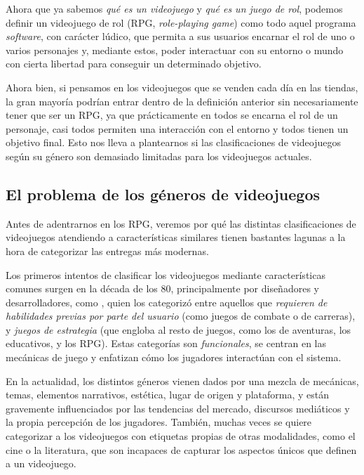 \medskip

Ahora que ya sabemos \textit{qué es un videojuego} y \textit{qué es un juego de rol}, podemos definir un videojuego de rol (RPG, \textit{role-playing game}) como todo aquel programa \textit{software}, con carácter lúdico, que permita a sus usuarios encarnar el rol de uno o varios personajes y, mediante estos, poder interactuar con su entorno o mundo con cierta libertad para conseguir un determinado objetivo.

\smallskip

Ahora bien, si pensamos en los videojuegos que se venden cada día en las tiendas, la gran mayoría podrían entrar dentro de la definición anterior sin necesariamente tener que ser un RPG, ya que prácticamente en todos se encarna el rol de un personaje, casi todos permiten una interacción con el entorno y todos tienen un objetivo final. Esto nos lleva a plantearnos si las clasificaciones de videojuegos según su género son demasiado limitadas para los videojuegos actuales.

\subsection{El problema de los géneros de videojuegos}
Antes de adentrarnos en los RPG, veremos por qué las distintas clasificaciones de videojuegos atendiendo a características similares tienen bastantes lagunas a la hora de categorizar las entregas más modernas.

\smallskip

Los primeros intentos de clasificar los videojuegos mediante características comunes surgen en la década de los 80, principalmente por diseñadores y desarrolladores, como \cite{Crawford84}, quien los categorizó entre aquellos que \textit{requieren de habilidades previas por parte del usuario} (como juegos de combate o de carreras), y \textit{juegos de estrategia} (que engloba al resto de juegos, como los de aventuras, los educativos, y los RPG). Estas categorías son \textit{funcionales}, se centran en las mecánicas de juego y enfatizan cómo los jugadores interactúan con el sistema.

\smallskip

En la actualidad, los distintos géneros vienen dados por una mezcla de mecánicas, temas, elementos narrativos, estética, lugar de origen y plataforma, y están gravemente influenciados por las tendencias del mercado, discursos mediáticos y la propia percepción de los jugadores. También, muchas veces se quiere categorizar a los videojuegos con etiquetas propias de otras modalidades, como el cine o la literatura, que son incapaces de capturar los aspectos únicos que definen a un videojuego.

